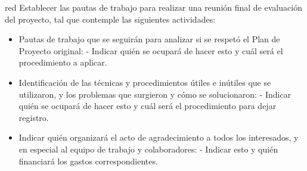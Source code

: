 \documentclass[11pt]{charter}
\begin{document}
\begin{consigna}{red}
Establecer las pautas de trabajo para realizar una reunión final de evaluación del proyecto, tal que contemple las siguientes actividades:

\begin{itemize}
\item Pautas de trabajo que se seguirán para analizar si se respetó el Plan de Proyecto original:
 - Indicar quién se ocupará de hacer esto y cuál será el procedimiento a aplicar. 
\item Identificación de las técnicas y procedimientos útiles e inútiles que se utilizaron, y los problemas que surgieron y cómo se solucionaron:
 - Indicar quién se ocupará de hacer esto y cuál será el procedimiento para dejar registro.
\item Indicar quién organizará el acto de agradecimiento a todos los interesados, y en especial al equipo de trabajo y colaboradores:
  - Indicar esto y quién financiará los gastos correspondientes.
\end{itemize}

\end{consigna}
\end{document}
